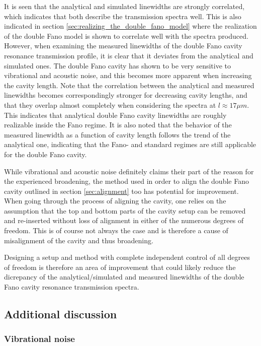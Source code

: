 It is seen that the analytical and simulated linewidths are strongly correlated, which indicates that both describe the transmission spectra well. This is also indicated in section \ref{sec:realizing_the_double_fano_model} where the realization of the double Fano model is shown to correlate well with the spectra produced. However, when examining the measured linewidths of the double Fano cavity resonance transmission profile, it is clear that it deviates from the analytical and simulated ones. The double Fano cavity has shown to be very sensitive to vibrational and acoustic noise, and this becomes more apparent when increasing the cavity length. Note that the correlation between the analytical and measured linewidths becomes correspondingly stronger for decreasing cavity lengths, and that they overlap almost completely when considering the spectra at $l \approx 17 \mu m$. This indicates that analytical double Fano cavity linewidths are roughly realizable inside the Fano regime. It is also noted that the behavior of the measured linewidth as a function of cavity length follows the trend of the analytical one, indicating that the Fano- and standard regimes are still applicable for the double Fano cavity. 

While vibrational and acoustic noise definitely claims their part of the reason for the experienced broadening, the method used in order to align the double Fano cavity outlined in section \ref{sec:alignment} too has potential for improvement. When going through the process of aligning the cavity, one relies on the assumption that the top and bottom parts of the cavity setup can be removed and re-inserted without loss of alignment in either of the numerous degrees of freedom. This is of course not always the case and is therefore a cause of misalignment of the cavity and thus broadening. 

Designing a setup and method with complete independent control of all degrees of freedom is therefore an area of improvement that could likely reduce the dicrepancy of the analytical/simulated and measured linewidths of the double Fano cavity resonance transmission spectra.

\subsection{Additional discussion}\label{sec:additional_discussion}

\subsubsection{Vibrational noise}


